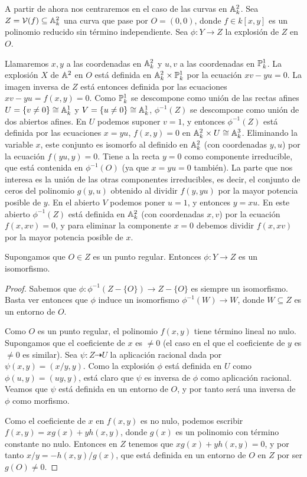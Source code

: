 \documentclass[ACGA.tex]{subfiles}
\begin{document}
A partir de ahora nos centraremos en el caso de las curvas en $\mathbb{A}^2_k$. Sea $Z=\mathcal{V}(f)\subseteq\mathbb{A}^2_k$ una curva que pase por $O=(0,0)$, donde $f\in k[x,y]$ es un polinomio reducido sin término independiente. Sea $\phi:Y\to Z$ la explosión de $Z$ en $O$. 

Llamaremos $x,y$ a las coordenadas en $\mathbb{A}^2_k$ y $u,v$ a las coordenadas en $\mathbb{P}^1_k$. La explosión $X$ de $\mathbb{A}^2$ en $O$ está definida en $\mathbb{A}^2_k\times\mathbb{P}^1_k$ por la ecuación $xv-yu=0$. La imagen inversa de $Z$ está entonces definida por las ecuaciones $xv-yu=f(x,y)=0$. Como $\mathbb{P}^1_k$ se descompone como unión de las rectas afines $U=\{v\neq 0\}\cong\mathbb{A}^1_k$ y $V=\{u\neq 0\}\cong\mathbb{A}^1_k$, $\phi^{-1}(Z)$ se descompone como unión de dos abiertos afines. En $U$ podemos suponer $v=1$, y entonces $\phi^{-1}(Z)$ está definida por las ecuaciones $x=yu$, $f(x,y)=0$ en $\mathbb{A}^2_k\times U\cong\mathbb{A}^3_k$. Eliminando la variable $x$, este conjunto es isomorfo al definido en $\mathbb{A}^2_k$ (con coordenadas $y,u$) por la ecuación $f(yu,y)=0$. Tiene a la recta $y=0$ como componente irreducible, que está contenida en $\phi^{-1}(O)$ (ya que $x=yu=0$ también). La parte que nos interesa es la unión de las otras componentes irreducibles, es decir, el conjunto de ceros del polinomio $g(y,u)$ obtenido al dividir $f(y,yu)$ por la mayor potencia posible de $y$.
 En el abierto $V$ podemos poner $u=1$, y entonces $y=xu$. En este abierto $\phi^{-1}(Z)$ está definida en $\mathbb{A}^2_k$ (con coordenadas $x,v$) por la ecuación $f(x,xv)=0$, y para eliminar la componente $x=0$ debemos dividir $f(x,xv)$ por la mayor potencia posible de $x$. 

\begin{prop}
 Supongamos que $O\in Z$ es un punto regular. Entonces $\phi:Y\to Z$ es un isomorfismo.
\end{prop}

\begin{proof}
 Sabemos que $\phi:\phi^{-1}(Z-\{O\})\to Z-\{O\}$ es siempre un isomorfismo. Basta ver entonces que $\phi$ induce un isomorfismo $\phi^{-1}(W)\to W$, donde $W\subseteq Z$ es un entorno de $O$. 

Como $O$ es un punto regular, el polinomio $f(x,y)$ tiene término lineal no nulo. Supongamos que el coeficiente de $x$ es $\neq 0$ (el caso en el que el coeficiente de $y$ es $\neq 0$ es similar). Sea $\psi:Z\dashrightarrow U$ la aplicación racional dada por $\psi(x,y)=(x/y,y)$. Como la explosión $\phi$ está definida en $U$ como $\phi(u,y)=(uy,y)$, está claro que $\psi$ es inversa de $\phi$ como aplicación racional. Veamos que $\psi$ está definida en un entorno de $O$, y por tanto será una inversa de $\phi$ como morfismo.

Como el coeficiente de $x$ en $f(x,y)$ es no nulo, podemos escribir $f(x,y)=xg(x)+yh(x,y)$, donde $g(x)$ es un polinomio con término constante no nulo. Entonces en $Z$ tenemos que $xg(x)+yh(x,y)=0$, y por tanto $x/y=-h(x,y)/g(x)$, que está definida en un entorno de $O$ en $Z$ por ser $g(O)\neq 0$.
\end{proof}  
\end{document}
